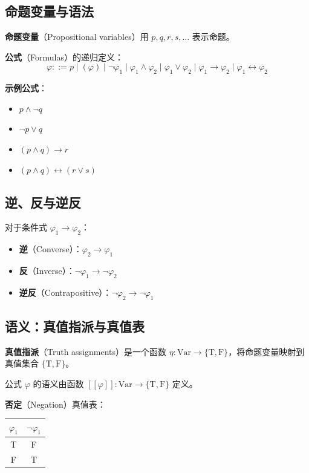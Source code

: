 \documentclass[UTF8,11pt,a4paper]{ctexbook}   %
\theoremstyle{definition}
\begin{document}
\subsection{命题变量与语法}

\textbf{命题变量}（Propositional variables）用 $p, q, r, s, \ldots$ 表示命题。

\textbf{公式}（Formulas）的递归定义：
\[
\varphi ::= p \mid (\varphi) \mid \neg \varphi_1 \mid \varphi_1 \land \varphi_2 \mid \varphi_1 \lor \varphi_2 \mid \varphi_1 \rightarrow \varphi_2 \mid \varphi_1 \leftrightarrow \varphi_2
\]

\textbf{示例公式}：
\begin{itemize}
    \item $p \land \neg q$
    \item $\neg p \lor q$
    \item $(p \land q) \rightarrow r$
    \item $(p \land q) \leftrightarrow (r \lor s)$
\end{itemize}

\subsection{逆、反与逆反}

对于条件式 $\varphi_1 \rightarrow \varphi_2$：
\begin{itemize}
    \item \textbf{逆}（Converse）：$\varphi_2 \rightarrow \varphi_1$
    \item \textbf{反}（Inverse）：$\neg \varphi_1 \rightarrow \neg \varphi_2$
    \item \textbf{逆反}（Contrapositive）：$\neg \varphi_2 \rightarrow \neg \varphi_1$
\end{itemize}

\subsection{语义：真值指派与真值表}

\textbf{真值指派}（Truth assignments）是一个函数 $\eta: \text{Var} \rightarrow \{\text{T}, \text{F}\}$，将命题变量映射到真值集合 $\{\text{T}, \text{F}\}$。

公式 $\varphi$ 的语义由函数 $[\![\varphi]\!]: \text{Var} \rightarrow \{\text{T}, \text{F}\}$ 定义。

\textbf{否定}（Negation）真值表：
\begin{table}[htbp]
\centering
\begin{tabular}{|c|c|}
\hline
$\varphi_1$ & $\neg \varphi_1$ \\
\hline
T & F \\
F & T \\
\hline
\end{tabular}
\end{table}
\end{document}
